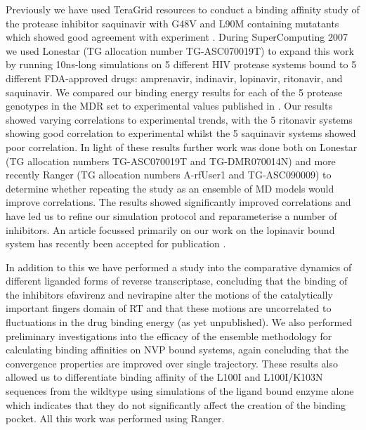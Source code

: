 Previously we have used TeraGrid resources to conduct a binding affinity study of the protease inhibitor saquinavir with G48V and L90M containing mutatants which showed good agreement with experiment \cite{Stoica2008}. During SuperComputing 2007 we used Lonestar (TG allocation number TG-ASC070019T) to expand this work by running 10ns-long simulations on 5 different HIV protease systems bound to 5 different FDA-approved drugs: amprenavir, indinavir, lopinavir, ritonavir, and saquinavir. We compared our binding energy results for each of the 5 protease genotypes in the MDR set to experimental values published in \cite{Ohtaka2003}. Our results showed varying correlations to experimental trends, with the 5 ritonavir systems showing good correlation to experimental whilst the 5 saquinavir systems showed poor correlation. In light of these results further work was done both on Lonestar (TG allocation numbers TG-ASC070019T and TG-DMR070014N) and more recently Ranger (TG allocation numbers A-rfUser1 and TG-ASC090009) to determine whether repeating the study as an ensemble of MD models would improve correlations. The results showed significantly improved correlations and have led us to refine our simulation protocol and reparameterise a number of inhibitors. An article focussed primarily on our work on the lopinavir bound system has recently been accepted for publication \cite{Sadiq2010}.

In addition to this we have performed a study into the comparative dynamics of different liganded forms of reverse transcriptase, concluding that the binding of the inhibitors efavirenz and nevirapine alter the motions of the catalytically important fingers domain of RT and that these motions are uncorrelated to fluctuations in the drug binding energy (as yet unpublished). We also performed preliminary investigations into the efficacy of the ensemble methodology for calculating binding affinities on NVP bound systems, again concluding that the convergence properties are improved over single trajectory. These results also allowed us to differentiate binding affinity of the L100I and L100I/K103N sequences from the wildtype using simulations of the ligand bound enzyme alone which indicates that they do not significantly affect the creation of the binding pocket. All this work was performed using Ranger. 

